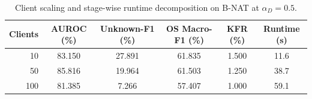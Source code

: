 \begin{table}[t]
\centering
\caption{Client scaling and stage-wise runtime decomposition on B-NAT at $\alpha_D=0.5$.}
\label{tab:client_scaling}
\small
\begin{tabular}{rccccc}
\toprule
Clients & AUROC (\%) & Unknown-F1 (\%) & OS Macro-F1 (\%) & KFR (\%) & Runtime (s) \\
\midrule
10 & 83.150 & 27.891 & 61.835 & 1.500 & 11.6 \\
50 & 85.816 & 19.964 & 61.503 & 1.250 & 38.7 \\
100 & 81.385 & 7.266 & 57.407 & 1.000 & 59.1 \\
\bottomrule
\end{tabular}
\end{table}